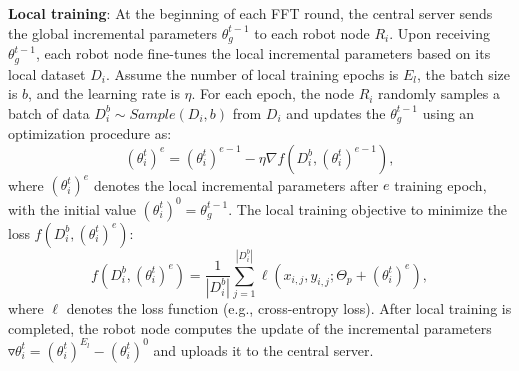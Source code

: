 \documentclass[lettersize,journal]{IEEEtran}
\begin{document}
\textbf{Local training}:
At the beginning of each FFT round, the central server sends the global incremental parameters $\theta_g^{t-1}$ to each robot node $R_i$. Upon receiving $\theta_g^{t-1}$, each robot node fine-tunes the local incremental parameters based on its local dataset $D_i$.
Assume the number of local training epochs is $E_l$, the batch size is $b$, and the learning rate is $\eta$. For each epoch, the node $R_i$ randomly samples a batch of data $D_i^b \sim Sample(D_i, b)$ from $D_i$ and updates the $\theta_g^{t-1}$ using an optimization procedure as:
\begin{equation}
    (\theta_i^{t})^e = (\theta_i^{t})^{e-1} - \eta \nabla f(D_i^b, (\theta_i^{t})^{e-1}),
\end{equation}
where $(\theta_i^{t})^e$ denotes the local incremental parameters after $e$ training epoch, with the initial value $(\theta_i^{t})^0 = \theta_g^{t-1}$.
The local training objective to minimize the loss $f(D_i^b, (\theta_i^{t})^e)$:
\begin{equation}
    f(D_i^b, (\theta_i^{t})^e) = \frac{1}{|D_i^b|} \sum_{j=1}^{|D_i^b|} \ell(x_{i,j}, y_{i,j}; \Theta_p + (\theta_i^{t})^e),
\end{equation}
where $\ell$ denotes the loss function (e.g., cross-entropy loss). After local training is completed, the robot node computes the update of the incremental parameters $\triangledown \theta_i^t = (\theta_i^t)^{E_l} - (\theta_i^t)^0$ and uploads it to the central server.
\end{document}
